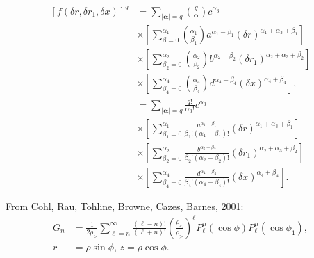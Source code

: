 \documentclass[a4paper,12pt]{article}
\newcommand{\bA}{\boldsymbol{\alpha}}
\begin{document}
\begin{align}
  \left[
    f(\delta r, \delta r_{1}, \delta x)
  \right]^{q}
  &=
  \sum_{|\bA|=q}\binom{q}{\bA}
  c^{\alpha_{3}}\nonumber\\
  &\times
  \left[\sum_{\beta=0}^{\alpha_{1}}
    \binom{\alpha_{1}}{\beta_{1}}
    a^{\alpha_{1}-\beta_{1}}
    \left(\delta r\right)^{\alpha_{1}+\alpha_{3}+\beta_{1}}
  \right]\nonumber\\
  &\times
  \left[\sum_{\beta_{2}=0}^{\alpha_{2}}
    \binom{\alpha_{2}}{\beta_{2}}
    b^{\alpha_{2}-\beta_{2}}
    \left(\delta r_{1}\right)^{\alpha_{2}+\alpha_{3}+\beta_{2}}
  \right]\nonumber\\
  &\times
  \left[\sum_{\beta_{4}=0}^{\alpha_{4}}
    \binom{\alpha_{4}}{\beta_{4}}
    d^{\alpha_{4}-\beta_{4}}
    \left(\delta x\right)^{\alpha_{4}+\beta_{4}}
  \right],\\
  &=
  \sum_{|\bA|=q}
  \frac{q!}{\alpha_{3}!}
  c^{\alpha_{3}}\nonumber\\
  &\times
  \left[\sum_{\beta_{1}=0}^{\alpha_{1}}
    \frac{a^{\alpha_{1}-\beta_{1}}}
    {\beta_{1}!(\alpha_{1}-\beta_{1})!}
    \left(\delta r\right)^{\alpha_{1}+\alpha_{3}+\beta_{1}}
  \right]\nonumber\\
  &\times
  \left[\sum_{\beta_{2}=0}^{\alpha_{2}}
    \frac{b^{\alpha_{2}-\beta_{2}}}
    {\beta_{2}!(\alpha_{2}-\beta_{2})!}
    \left(\delta r_{1}\right)^{\alpha_{2}+\alpha_{3}+\beta_{2}}
  \right]\nonumber\\
  &\times
  \left[\sum_{\beta_{4}=0}^{\alpha_{4}}
    \frac{d^{\alpha_{4}-\beta_{4}}}
    {\beta_{4}!(\alpha_{4}-\beta_{4})!}
    \left(\delta x\right)^{\alpha_{4}+\beta_{4}}
  \right].  
\end{align}

From Cohl, Rau, Tohline, Browne, Cazes, Barnes, 2001:
\begin{align}
  G_{n}
  &=
  \frac{1}{2\rho_{>}}
  \sum_{\ell=n}^{\infty}
  \frac{(\ell-n)!}{(\ell+n)!}
  \left(
    \frac{\rho_{<}}{\rho_{>}}
  \right)^{\ell}
  P_{\ell}^{n}(\cos\phi)
  P_{\ell}^{n}(\cos\phi_{1}),\\
  r &= \rho\sin\phi,\, z = \rho\cos\phi.
\end{align}
\end{document}
